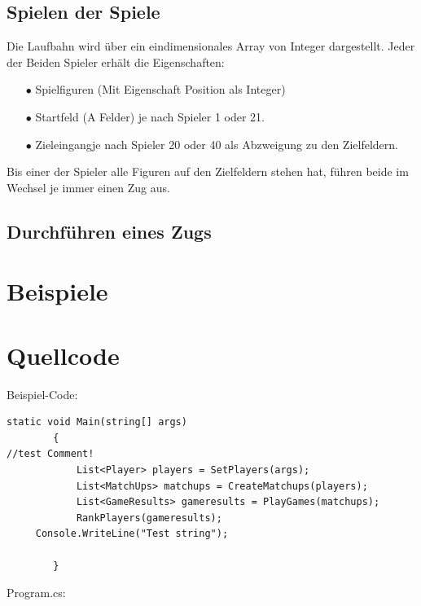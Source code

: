 \documentclass[a4paper,11pt,ngerman]{scrartcl}
\begin{document}
\subsection{Spielen der \glqq Spiele\grqq}
Die Laufbahn wird über ein eindimensionales Array von Integer dargestellt. Jeder der Beiden Spieler erhält die Eigenschaften:
\begin{enumerate}
	\item[$\bullet$] Spielfiguren (Mit Eigenschaft Position als Integer)
	\item[$\bullet$] Startfeld (\glqq A Felder\grqq) je nach Spieler 1 oder 21.
	\item[$\bullet$] \glqq Zieleingang\grqq  je nach Spieler 20 oder 40 als Abzweigung zu den Zielfeldern.	
\end{enumerate} 
Bis einer der Spieler alle Figuren auf den Zielfeldern stehen hat, führen beide im Wechsel je immer einen Zug aus.
\subsection{Durchführen eines Zugs}


 

\section{Beispiele}
\section{Quellcode}
Beispiel-Code:
\begin{lstlisting}
static void Main(string[] args)
        {
//test Comment!
            List<Player> players = SetPlayers(args);
            List<MatchUps> matchups = CreateMatchups(players);
            List<GameResults> gameresults = PlayGames(matchups);
            RankPlayers(gameresults);
	 Console.WriteLine("Test string");
            
        }
\end{lstlisting}
Program.cs:

\end{document}
